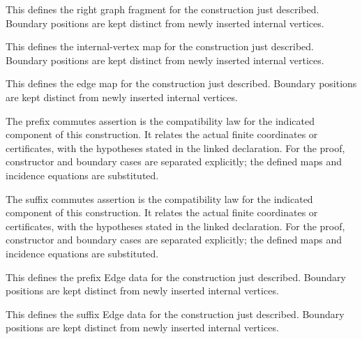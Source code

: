 This defines the right graph fragment for the construction just described. Boundary positions are kept distinct from newly inserted internal vertices.
\par{}

This defines the internal-vertex map for the construction just described. Boundary positions are kept distinct from newly inserted internal vertices.
\par{}

This defines the edge map for the construction just described. Boundary positions are kept distinct from newly inserted internal vertices.
\par{}

The prefix commutes assertion is the compatibility law for the indicated component of this construction. It relates the actual finite coordinates or certificates, with the hypotheses stated in the linked declaration.
For the proof, constructor and boundary cases are separated explicitly; the defined maps and incidence equations are substituted.
\par{}

The suffix commutes assertion is the compatibility law for the indicated component of this construction. It relates the actual finite coordinates or certificates, with the hypotheses stated in the linked declaration.
For the proof, constructor and boundary cases are separated explicitly; the defined maps and incidence equations are substituted.
\par{}

This defines the prefix Edge data for the construction just described. Boundary positions are kept distinct from newly inserted internal vertices.
\par{}

This defines the suffix Edge data for the construction just described. Boundary positions are kept distinct from newly inserted internal vertices.
\par{}

